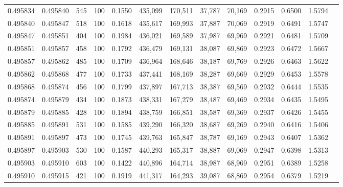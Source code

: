 \begin{tabular}{rrrrrrrrrrrrr}
0.495834 & 0.495840 &   545 & 100 &                                     0.1550 & 435,099 & 170,511 &  37,787 &  70,169 & 0.2915 & 0.6500 & 1.5794 \\
0.495840 & 0.495847 &   518 & 100 &                                     0.1618 & 435,617 & 169,993 &  37,887 &  70,069 & 0.2919 & 0.6491 & 1.5747 \\
0.495847 & 0.495851 &   404 & 100 &                                     0.1984 & 436,021 & 169,589 &  37,987 &  69,969 & 0.2921 & 0.6481 & 1.5709 \\
0.495851 & 0.495857 &   458 & 100 &                                     0.1792 & 436,479 & 169,131 &  38,087 &  69,869 & 0.2923 & 0.6472 & 1.5667 \\
0.495857 & 0.495862 &   485 & 100 &                                     0.1709 & 436,964 & 168,646 &  38,187 &  69,769 & 0.2926 & 0.6463 & 1.5622 \\
0.495862 & 0.495868 &   477 & 100 &                                     0.1733 & 437,441 & 168,169 &  38,287 &  69,669 & 0.2929 & 0.6453 & 1.5578 \\
0.495868 & 0.495874 &   456 & 100 &                                     0.1799 & 437,897 & 167,713 &  38,387 &  69,569 & 0.2932 & 0.6444 & 1.5535 \\
0.495874 & 0.495879 &   434 & 100 &                                     0.1873 & 438,331 & 167,279 &  38,487 &  69,469 & 0.2934 & 0.6435 & 1.5495 \\
0.495879 & 0.495885 &   428 & 100 &                                     0.1894 & 438,759 & 166,851 &  38,587 &  69,369 & 0.2937 & 0.6426 & 1.5455 \\
0.495885 & 0.495891 &   531 & 100 &                                     0.1585 & 439,290 & 166,320 &  38,687 &  69,269 & 0.2940 & 0.6416 & 1.5406 \\
0.495891 & 0.495897 &   473 & 100 &                                     0.1745 & 439,763 & 165,847 &  38,787 &  69,169 & 0.2943 & 0.6407 & 1.5362 \\
0.495897 & 0.495903 &   530 & 100 &                                     0.1587 & 440,293 & 165,317 &  38,887 &  69,069 & 0.2947 & 0.6398 & 1.5313 \\
0.495903 & 0.495910 &   603 & 100 &                                     0.1422 & 440,896 & 164,714 &  38,987 &  68,969 & 0.2951 & 0.6389 & 1.5258 \\
0.495910 & 0.495915 &   421 & 100 &                                     0.1919 & 441,317 & 164,293 &  39,087 &  68,869 & 0.2954 & 0.6379 & 1.5219 \\

\end{tabular}
